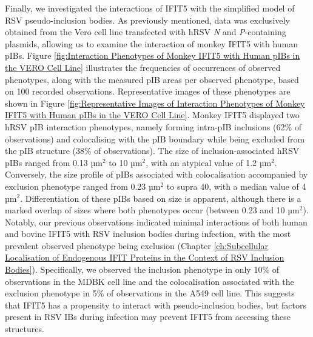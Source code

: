 Finally, we investigated the interactions of IFIT5 with the simplified model of RSV pseudo-inclusion bodies. As previously mentioned, data was exclusively obtained from the Vero cell line transfected with hRSV \textit{N} and \textit{P}-containing plasmids, allowing us to examine the interaction of monkey IFIT5 with human pIBs. Figure \ref{fig:Interaction Phenotypes of Monkey IFIT5 with Human pIBs in the VERO Cell Line} illustrates the frequencies of occurrences of observed phenotypes, along with the measured pIB areas per observed phenotype, based on 100 recorded observations. Representative images of these phenotypes are shown in Figure \ref{fig:Representative Images of Interaction Phenotypes of Monkey IFIT5 with Human pIBs in the VERO Cell Line}. Monkey IFIT5 displayed two hRSV pIB interaction phenotypes, namely forming intra-pIB inclusions (62\% of observations) and colocalising with the pIB boundary while being excluded from the pIB structure (38\% of observations). The size of inclusion-associated hRSV pIBs ranged from 0.13 \(\mbox{µm}^2\) to 10 \(\mbox{µm}^2\), with an atypical value of 1.2 \(\mbox{µm}^2\). Conversely, the size profile of pIBs associated with colocalisation accompanied by exclusion phenotype ranged from 0.23 \(\mbox{µm}^2\) to supra 40, with a median value of 4 \(\mbox{µm}^2\). Differentiation of these pIBs based on size is apparent, although there is a marked overlap of sizes where both phenotypes occur (between 0.23 and 10 \(\mbox{µm}^2\)). Notably, our previous observations indicated minimal interactions of both human and bovine IFIT5 with RSV inclusion bodies during infection, with the most prevalent observed phenotype being exclusion (Chapter \ref{ch:Subcellular Localisation of Endogenous IFIT Proteins in the Context of RSV Inclusion Bodies}). Specifically, we observed the inclusion phenotype in only 10\% of observations in the MDBK cell line and the colocalisation associated with the exclusion phenotype in 5\% of observations in the A549 cell line. This suggests that IFIT5 has a propensity to interact with pseudo-inclusion bodies, but factors present in RSV IBs during infection may prevent IFIT5 from accessing these structures.

